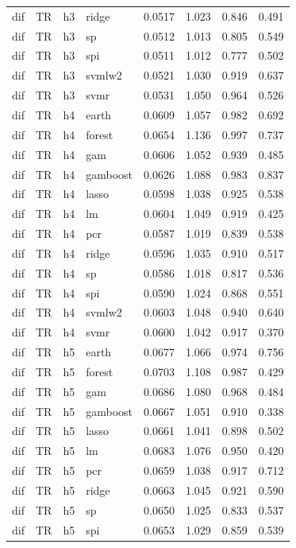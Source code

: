 \begin{ThreePartTable}
\begin{longtable}[t]{llclcccc}
dif & TR & h3 & ridge & 0.0517 & 1.023 & 0.846 & 0.491\\
dif & TR & h3 & sp & 0.0512 & 1.013 & 0.805 & 0.549\\
dif & TR & h3 & spi & 0.0511 & 1.012 & 0.777 & 0.502\\
dif & TR & h3 & svmlw2 & 0.0521 & 1.030 & 0.919 & 0.637\\
dif & TR & h3 & svmr & 0.0531 & 1.050 & 0.964 & 0.526\\
\addlinespace
dif & TR & h4 & earth & 0.0609 & 1.057 & 0.982 & 0.692\\
dif & TR & h4 & forest & 0.0654 & 1.136 & 0.997 & 0.737\\
dif & TR & h4 & gam & 0.0606 & 1.052 & 0.939 & 0.485\\
dif & TR & h4 & gamboost & 0.0626 & 1.088 & 0.983 & 0.837\\
dif & TR & h4 & lasso & 0.0598 & 1.038 & 0.925 & 0.538\\
dif & TR & h4 & lm & 0.0604 & 1.049 & 0.919 & 0.425\\
dif & TR & h4 & pcr & 0.0587 & 1.019 & 0.839 & 0.538\\
dif & TR & h4 & ridge & 0.0596 & 1.035 & 0.910 & 0.517\\
dif & TR & h4 & sp & 0.0586 & 1.018 & 0.817 & 0.536\\
dif & TR & h4 & spi & 0.0590 & 1.024 & 0.868 & 0.551\\
dif & TR & h4 & svmlw2 & 0.0603 & 1.048 & 0.940 & 0.640\\
dif & TR & h4 & svmr & 0.0600 & 1.042 & 0.917 & 0.370\\
\addlinespace
dif & TR & h5 & earth & 0.0677 & 1.066 & 0.974 & 0.756\\
dif & TR & h5 & forest & 0.0703 & 1.108 & 0.987 & 0.429\\
dif & TR & h5 & gam & 0.0686 & 1.080 & 0.968 & 0.484\\
dif & TR & h5 & gamboost & 0.0667 & 1.051 & 0.910 & 0.338\\
dif & TR & h5 & lasso & 0.0661 & 1.041 & 0.898 & 0.502\\
dif & TR & h5 & lm & 0.0683 & 1.076 & 0.950 & 0.420\\
dif & TR & h5 & pcr & 0.0659 & 1.038 & 0.917 & 0.712\\
dif & TR & h5 & ridge & 0.0663 & 1.045 & 0.921 & 0.590\\
dif & TR & h5 & sp & 0.0650 & 1.025 & 0.833 & 0.537\\
dif & TR & h5 & spi & 0.0653 & 1.029 & 0.859 & 0.539\\

\end{longtable}
\end{ThreePartTable}
